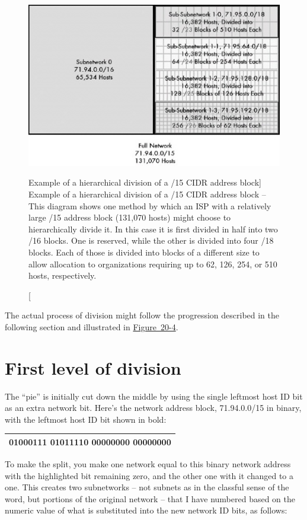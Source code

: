 \begin{figure}
   \centering
   \includegraphics[width=.7\textwidth]{images/isp-divide-15.jpg}
   \caption
      [Example of a hierarchical division of a /15 CIDR address block]
      {Example of a hierarchical division of a /15 CIDR address block --
      This diagram shows one method by which an ISP with a relatively large /15 address block (131,070 hosts) might choose to hierarchically divide it.
      In this case it is first divided in half into two /16 blocks.
      One is reserved, while the other is divided into four /18 blocks.
      Each  of those is divided into blocks of a different size to allow allocation to organizations requiring up to 62, 126, 254, or 510 hosts, respectively.}
   \label{fig:isp-divide-15}
\end{figure}


The actual process of division might follow the progression described in the following section and illustrated in
\protect\hyperlink{ch20s04.htmlux5cux23hierarchical_address_division_using_cidr}{Figure~20-4}.



\section{First level of division}

The ``pie'' is initially cut down the middle by using the single leftmost host ID bit as an extra network bit.
Here's the network address block, 71.94.0.0/15 in binary, with the leftmost host ID bit shown in bold:

\begin{longtable}[]{@{}l@{}}
\toprule
\endhead
01000111 0101111{\textbf{0}} 00000000 00000000\tabularnewline
\bottomrule
\end{longtable}



To make the split, you make one network equal to this binary network
address with the highlighted bit remaining zero, and the other one with
it changed to a one. This creates two subnetworks -- not subnets as in
the classful sense of the word, but portions of the original
network -- that I have numbered based on the numeric value of what is
substituted into the new network ID bits, as follows:

